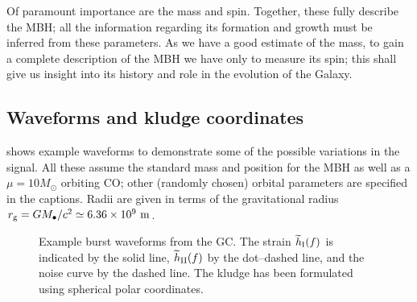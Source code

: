 Of paramount importance are the mass and spin. Together, these fully describe the MBH; all the information regarding its formation and growth must be inferred from these parameters. As we have a good estimate of the mass, to gain a complete description of the MBH we have only to measure its spin; this shall give us insight into its history and role in the evolution of the Galaxy.

\subsection{Waveforms and kludge coordinates}\label{sec:wave-ex}

 shows example waveforms to demonstrate some of the possible variations in the signal. All these assume the standard mass and position for the MBH as well as a $\mu = 10 M_\odot$ orbiting CO; other (randomly chosen) orbital parameters are specified in the captions. Radii are given in terms of the gravitational radius $r_\mathrm{g} = GM_\bullet / c^2 \simeq 6.36 \times 10^9~\mathrm{m}$.
\begin{figure}
  \centering
    \quad
\caption{Example burst waveforms from the GC. The strain $\widetilde{h}_\mathrm{I}(f)$ is indicated by the solid line, $\widetilde{h}_\mathrm{II}(f)$ by the dot--dashed line, and the noise curve by the dashed line. The kludge has been formulated using spherical polar coordinates.}
  \label{fig:Examples}
\end{figure}

